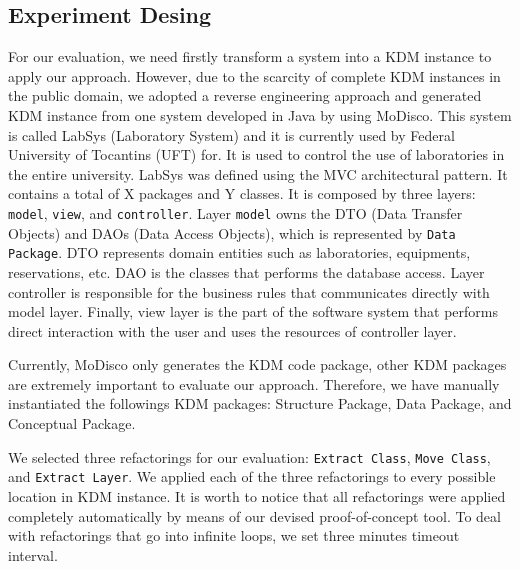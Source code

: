 \subsection{Experiment Desing}

For our evaluation, we need firstly transform a system into a KDM instance to apply our approach. However, due to the scarcity of complete KDM instances in the public domain, we adopted a reverse engineering approach and generated KDM instance from one system developed in Java by using MoDisco. This system is called LabSys (Laboratory System) and it is currently used by Federal University of Tocantins (UFT) for. It is used to control the use of laboratories in the entire university. %
%
%
LabSys  was defined using the MVC architectural pattern. It contains a total of X packages and Y classes. It is composed by three layers: \texttt{model}, \texttt{view}, and \texttt{controller}. Layer \texttt{model} owns the  DTO (Data Transfer Objects) and DAOs (Data Access Objects), which is represented by \texttt{Data Package}. DTO represents domain entities such as laboratories, equipments, reservations, etc. DAO is the classes that performs the database access. Layer controller is responsible for the business rules that communicates directly with model layer. Finally, view layer is the part of the software system that performs direct interaction with the user and uses the resources of controller layer.

Currently, MoDisco only generates the KDM code package, other KDM packages are extremely important to evaluate our approach. Therefore, we have manually instantiated the followings KDM packages: Structure Package, Data Package, and Conceptual Package.

We selected three refactorings for our evaluation: \texttt{Extract Class}, \texttt{Move Class}, and \texttt{Extract Layer}. We applied each of the three refactorings to every possible location in KDM instance. It is worth to notice that all refactorings were applied completely automatically by means of our devised proof-of-concept tool. To deal with refactorings that go into infinite loops, we set three minutes timeout interval.


